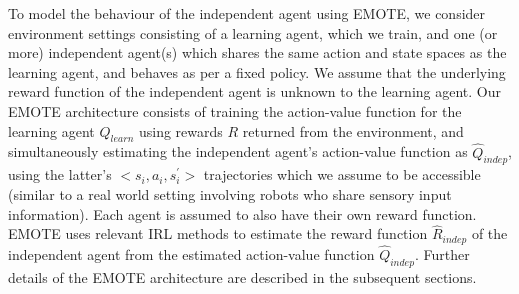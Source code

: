 To model the behaviour of the independent agent using EMOTE, we consider environment settings consisting of a learning agent, which we train, and one (or more) independent agent(s) which shares the same action and state spaces
as the learning agent, and behaves as per a fixed policy. We assume that the underlying reward function of the independent agent is unknown to the learning agent. Our EMOTE architecture consists of training the action-value function for the learning agent $Q_{learn}$ using rewards $R$ returned from the environment, and simultaneously estimating the independent agent's action-value function as $\hat{Q}_{indep}$, using the latter's $<s_{i},a_{i},s_{i}^{'}>$ trajectories which we assume to be accessible (similar to a real world setting involving robots who share sensory input information). Each agent is assumed to also have their own reward function. 
  EMOTE uses relevant IRL methods to estimate the reward function $\hat{R}_{indep}$ of the independent agent from the estimated action-value function $\hat{Q}_{indep}$. Further details of the EMOTE architecture are described in the subsequent sections.


\iffalse
\begin{definition}
In a multiagent learning scenario involving a learning agent with action value function $Q_{learn}$ and an independent agent (sharing the same action space $\mathcal{A}$ as the learning agent) which behaves as per an arbitrary unknown policy, we define state $\bar{s}$ of the learning agent to be analogous with state $s$ of the independent agent if: 
\begin{equation*}
 \underset{a'}{argmax}{Q_{learn}(\bar{s},a')} = a_{i}   
\end{equation*}
\noindent{}where $a_{i}\in\mathcal{A}$ is the observed action of the independent agent in state $s$. 
\end{definition}
\fi

